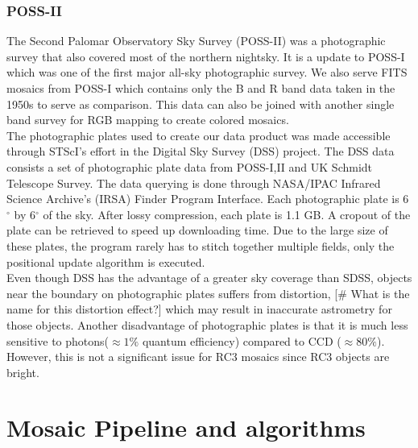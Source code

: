 \documentclass[5p]{elsarticle}
\begin{document}
	\subsubsection{POSS-II}
	The Second Palomar Observatory Sky Survey (POSS-II) was a photographic survey that also covered most of the northern nightsky. It is a update to POSS-I which was one of the first major all-sky photographic survey. We also serve FITS mosaics from POSS-I which contains only the B and R band data taken in the 1950s to serve as comparison. This data can also be joined with another single band survey  for RGB mapping to create colored mosaics.
\\
\indent	The photographic plates used to create our data product was made accessible through  STScI's effort in the Digital Sky Survey (DSS) project. The DSS data consists a set of  photographic plate data from POSS-I,II and UK Schmidt Telescope Survey. The data querying is done  through NASA/IPAC Infrared Science Archive's  (IRSA) Finder Program Interface. Each photographic plate is 6$^{\circ}$ by 6$^{\circ}$ of the sky. After lossy compression, each plate is 1.1 GB. A cropout of the plate  can be retrieved  to speed up downloading time. Due to the large size of these plates, the program rarely has to stitch together multiple fields, only the positional update algorithm is executed.
\\
\indent Even though DSS has the advantage of a  greater sky coverage than SDSS, objects near the boundary on photographic plates suffers from distortion, [\# What is the name for this distortion effect?] which may result in inaccurate astrometry for those objects.	Another disadvantage of photographic plates is that it is much less sensitive to photons($\approx 1\%$ quantum efficiency) compared to  CCD  ($\approx 80\%$). However, this is not a significant issue for RC3 mosaics since RC3 objects are bright. 
	
\section{Mosaic Pipeline and algorithms}
\end{document}
